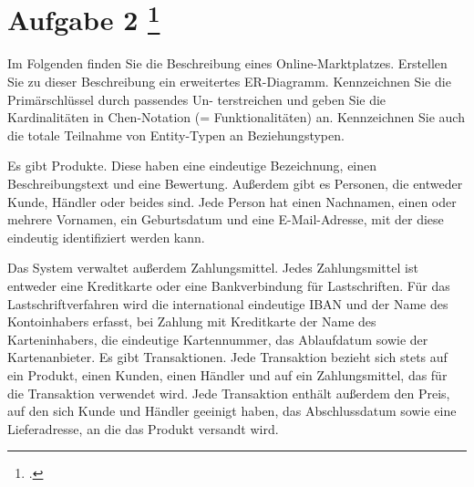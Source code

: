 \documentclass{lehramt-informatik-aufgabe}
\begin{document}
\section{Aufgabe 2
\footcite{66116:2021:03}}

Im Folgenden finden Sie die Beschreibung eines Online-Marktplatzes.
Erstellen Sie zu dieser Beschreibung ein erweitertes ER-Diagramm.
Kennzeichnen Sie die Primärschlüssel durch passendes Un- terstreichen
und geben Sie die Kardinalitäten in Chen-Notation (= Funktionalitäten)
an. Kennzeichnen Sie auch die totale Teilnahme von Entity-Typen an
Beziehungstypen.

Es gibt Produkte. Diese haben eine eindeutige Bezeichnung, einen
Beschreibungstext und eine Bewertung. Außerdem gibt es Personen, die
entweder Kunde, Händler oder beides sind. Jede Person hat einen
Nachnamen, einen oder mehrere Vornamen, ein Geburtsdatum und eine
E-Mail-Adresse, mit der diese eindeutig identifiziert werden kann.

Das System verwaltet außerdem Zahlungsmittel. Jedes Zahlungsmittel ist
entweder eine Kreditkarte oder eine Bankverbindung für Lastschriften.
Für das Lastschriftverfahren wird die international eindeutige IBAN und
der Name des Kontoinhabers erfasst, bei Zahlung mit Kreditkarte der Name
des Karteninhabers, die eindeutige Kartennummer, das Ablaufdatum sowie
der Kartenanbieter. Es gibt Transaktionen. Jede Transaktion bezieht sich
stets auf ein Produkt, einen Kunden, einen Händler und auf ein
Zahlungsmittel, das für die Transaktion verwendet wird. Jede Transaktion
enthält außerdem den Preis, auf den sich Kunde und Händler geeinigt
haben, das Abschlussdatum sowie eine Lieferadresse, an die das Produkt
versandt wird.
\end{document}
